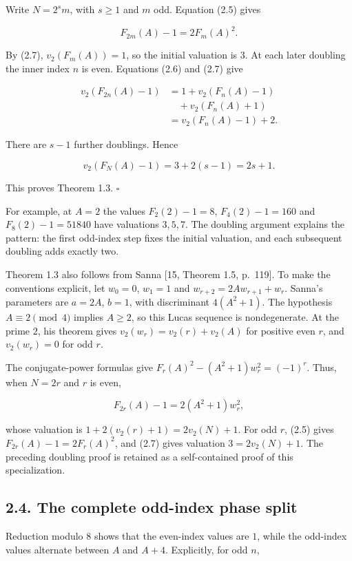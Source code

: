 \documentclass[11pt,a4paper]{article}
\begin{document}
Write \(N=2^s m\), with \(s\ge1\) and \(m\) odd. Equation (2.5) gives

\[
F_{2m}(A)-1=2F_m(A)^2.
\]

By (2.7), \(v_2(F_m(A))=1\), so the initial valuation is \(3\). At each
later doubling the inner index \(n\) is even. Equations (2.6) and (2.7)
give

\[
\begin{aligned}
v_2(F_{2n}(A)-1)
&=1+v_2(F_n(A)-1)\\
&\quad+v_2(F_n(A)+1)\\
&=v_2(F_n(A)-1)+2.
\end{aligned}
\]

There are \(s-1\) further doublings. Hence

\[
v_2(F_N(A)-1)=3+2(s-1)=2s+1.
\]

This proves Theorem 1.3. \(\square\)

For example, at \(A=2\) the values \(F_2(2)-1=8\), \(F_4(2)-1=160\) and
\(F_8(2)-1=51840\) have valuations \(3,5,7\). The doubling argument
explains the pattern: the first odd-index step fixes the initial
valuation, and each subsequent doubling adds exactly two.

Theorem 1.3 also follows from Sanna {[}15, Theorem 1.5, p.~119{]}. To
make the conventions explicit, let \(w_0=0\), \(w_1=1\) and
\(w_{r+2}=2Aw_{r+1}+w_r\). Sanna's parameters are \(a=2A\), \(b=1\),
with discriminant \(4(A^2+1)\). The hypothesis \(A\equiv2\pmod4\)
implies \(A\ge2\), so this Lucas sequence is nondegenerate. At the prime
\(2\), his theorem gives \(v_2(w_r)=v_2(r)+v_2(A)\) for positive even
\(r\), and \(v_2(w_r)=0\) for odd \(r\).

The conjugate-power formulas give \(F_r(A)^2-(A^2+1)w_r^2=(-1)^r\).
Thus, when \(N=2r\) and \(r\) is even,

\[
F_{2r}(A)-1=2(A^2+1)w_r^2,
\]

whose valuation is \(1+2(v_2(r)+1)=2v_2(N)+1\). For odd \(r\), (2.5)
gives \(F_{2r}(A)-1=2F_r(A)^2\), and (2.7) gives valuation
\(3=2v_2(N)+1\). The preceding doubling proof is retained as a
self-contained proof of this specialization.

\subsection{2.4. The complete odd-index phase split}\label{odd-phases}

Reduction modulo \(8\) shows that the even-index values are \(1\), while
the odd-index values alternate between \(A\) and \(A+4\). Explicitly,
for odd \(n\),
\end{document}
